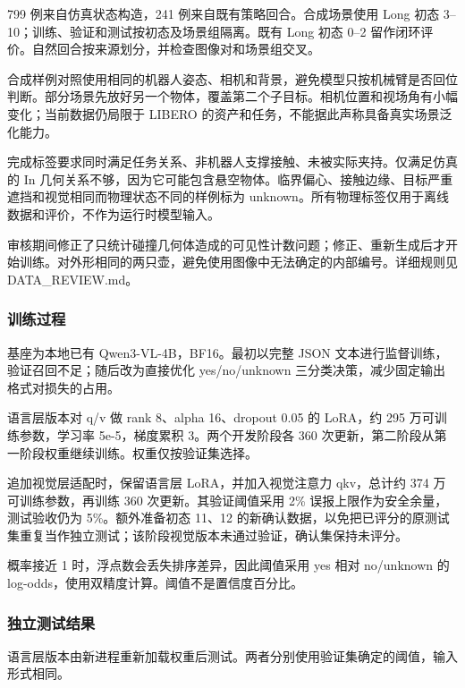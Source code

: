 799 例来自仿真状态构造，241 例来自既有策略回合。合成场景使用 Long 初态 3--10；训练、验证和测试按初态及场景组隔离。既有 Long 初态 0--2 留作闭环评价。自然回合按来源划分，并检查图像对和场景组交叉。

合成样例对照使用相同的机器人姿态、相机和背景，避免模型只按机械臂是否回位判断。部分场景先放好另一个物体，覆盖第二个子目标。相机位置和视场角有小幅变化；当前数据仍局限于 LIBERO 的资产和任务，不能据此声称具备真实场景泛化能力。

完成标签要求同时满足任务关系、非机器人支撑接触、未被实际夹持。仅满足仿真的 In 几何关系不够，因为它可能包含悬空物体。临界偏心、接触边缘、目标严重遮挡和视觉相同而物理状态不同的样例标为 unknown。所有物理标签仅用于离线数据和评价，不作为运行时模型输入。

审核期间修正了只统计碰撞几何体造成的可见性计数问题；修正、重新生成后才开始训练。对外形相同的两只壶，避免使用图像中无法确定的内部编号。详细规则见 DATA\_REVIEW.md。

\subsubsection{训练过程}\label{s11-detail-10}

基座为本地已有 Qwen3-VL-4B，BF16。最初以完整 JSON 文本进行监督训练，验证召回不足；随后改为直接优化 yes/no/unknown 三分类决策，减少固定输出格式对损失的占用。

语言层版本对 q/v 做 rank 8、alpha 16、dropout 0.05 的 LoRA，约 295 万可训练参数，学习率 5e-5，梯度累积 3。两个开发阶段各 360 次更新，第二阶段从第一阶段权重继续训练。权重仅按验证集选择。

追加视觉层适配时，保留语言层 LoRA，并加入视觉注意力 qkv，总计约 374 万可训练参数，再训练 360 次更新。其验证阈值采用 2\% 误报上限作为安全余量，测试验收仍为 5\%。额外准备初态 11、12 的新确认数据，以免把已评分的原测试集重复当作独立测试；该阶段视觉版本未通过验证，确认集保持未评分。

概率接近 1 时，浮点数会丢失排序差异，因此阈值采用 yes 相对 no/unknown 的 log-odds，使用双精度计算。阈值不是置信度百分比。

\subsubsection{独立测试结果}\label{s11-detail-11}

语言层版本由新进程重新加载权重后测试。两者分别使用验证集确定的阈值，输入形式相同。

